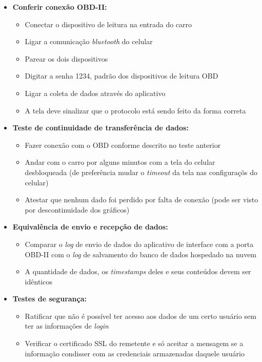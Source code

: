 \begin{itemize}
    \item \textbf{Conferir conexão OBD-II:} 
    
    \begin{itemize}
        \item Conectar o dispositivo de leitura na entrada do carro
        \item Ligar a comunicação \textit{bluetooth} do celular
        \item Parear os dois dispositivos
        \item Digitar a senha 1234, padrão dos dispositivos de leitura OBD
        \item Ligar a coleta de dados através do aplicativo
        \item A tela deve sinalizar que o protocolo está sendo feito da forma correta
    \end{itemize}
    
    \item \textbf{Teste de continuidade de transferência de dados:} 
    \begin{itemize}
        \item Fazer conexão com o OBD conforme descrito no teste anterior
        \item Andar com o carro por alguns minutos com a tela do celular desbloqueada (de preferência mudar o \textit{timeout} da tela nas configuraçõs do celular)
        \item Atestar que nenhum dado foi perdido por falta de conexão (pode ser visto por descontinuidade dos gráficos)
    \end{itemize}
    
    \item \textbf{Equivalência de envio e recepção de dados:}
    \begin{itemize}
        \item Comparar o \textit{log} de envio de dados do aplicativo de interface com a porta OBD-II com o \textit{log} de salvamento do banco de dados hospedado na nuvem
        \item A quantidade de dados, os \textit{timestamps} deles e seus conteúdos devem ser idênticos
    \end{itemize}
    
    \item \textbf{Testes de segurança:} 
    \begin{itemize}
        \item Ratificar que não é possível ter acesso aos dados de um certo usuário sem ter as informações de \textit{login}
        \item Verificar o certificado SSL do remetente e só aceitar a mensagem se a informação condisser com as credenciais armazenadas daquele usuário
    \end{itemize}
    

\end{itemize}
